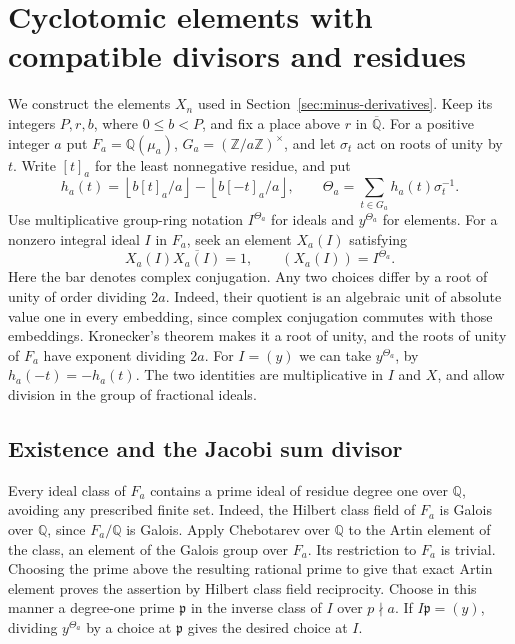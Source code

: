 \section{Cyclotomic elements with compatible divisors and residues}
\label{sec:minus-cyclotomic-elements}

We construct the elements \(X_n\) used in
Section~\ref{sec:minus-derivatives}. Keep its integers \(P,r,b\),
where \(0\le b<P\), and fix a place above \(r\) in
\(\overline{\mathbb Q}\). For a positive integer \(a\) put
\(F_a=\mathbb Q(\mu_a)\), \(G_a=(\mathbb Z/a\mathbb Z)^\times\),
and let \(\sigma_t\) act on roots of unity by \(t\). Write
\([t]_a\) for the least nonnegative residue, and put
\[
   h_a(t)=\left\lfloor b[t]_a/a\right\rfloor-
            \left\lfloor b[-t]_a/a\right\rfloor,\qquad
   \Theta_a=\sum_{t\in G_a} h_a(t)\sigma_t^{-1}.
\]
Use multiplicative group-ring notation \(I^{\Theta_a}\) for ideals
and \(y^{\Theta_a}\) for elements. For a nonzero integral ideal
\(I\) in \(F_a\), seek an element \(X_a(I)\) satisfying
\[
       X_a(I)\overline{X_a(I)}=1,\qquad
       (X_a(I))=I^{\Theta_a}.
\]
Here the bar denotes complex conjugation. Any two choices differ by
a root of unity of order dividing \(2a\). Indeed, their quotient
is an algebraic unit of absolute value one in every embedding,
since complex conjugation commutes with those embeddings.
Kronecker's theorem makes it a root of unity, and the roots of
unity of \(F_a\) have exponent dividing \(2a\).
For \(I=(y)\) we can take \(y^{\Theta_a}\), by
\(h_a(-t)=-h_a(t)\). The two identities are multiplicative in \(I\)
and \(X\), and allow division in the group of fractional ideals.

\subsection{Existence and the Jacobi sum divisor}

Every ideal class of \(F_a\) contains a prime ideal of residue
degree one over \(\mathbb Q\), avoiding any prescribed finite set.
Indeed, the Hilbert class field of \(F_a\) is Galois over
\(\mathbb Q\), since \(F_a/\mathbb Q\) is Galois. Apply Chebotarev
over \(\mathbb Q\) to the Artin element of the class, an element
of the Galois group over \(F_a\). Its restriction to \(F_a\) is
trivial. Choosing the prime above the resulting rational prime to
give that exact Artin element proves the assertion by Hilbert class
field reciprocity. Choose in this manner a degree-one prime
\(\mathfrak p\) in the inverse class of \(I\) over \(p\nmid a\).
If \(I\mathfrak p=(y)\), dividing \(y^{\Theta_a}\) by a choice
at \(\mathfrak p\) gives the desired choice at \(I\).

